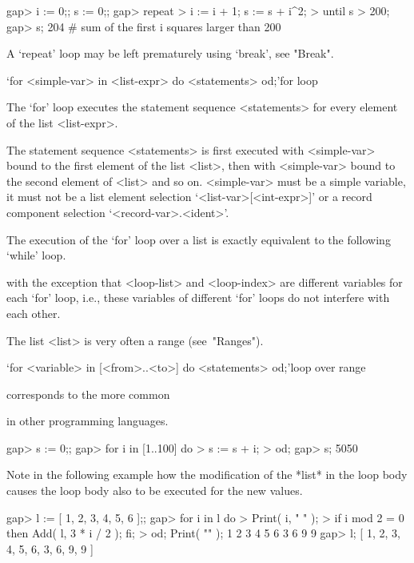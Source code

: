 {\beginexample
gap> i := 0;; s := 0;;
gap> repeat
>    i := i + 1; s := s + i^2;
>  until s > 200;
gap> s;
204    # sum of the first i squares larger than 200
\endexample

A `repeat' loop may be left prematurely using `break', see "Break".




\>`for <simple-var> in <list-expr> do <statements> od;'{for loop}

The `for' loop executes  the statement sequence <statements> for every
element of the list <list-expr>.

The statement sequence <statements> is first executed with <simple-var>
bound to the first element of the list <list>, then with <simple-var>
bound to the second element of <list> and so on. <simple-var> must be a
simple variable,  it  must not   be  a list   element  selection
`<list-var>[<int-expr>]'   or    a  record  component selection
`<record-var>.<ident>'.

The execution of the `for' loop over a list is exactly equivalent to
the following `while' loop.


with the  exception  that <loop-list> and <loop-index> are different
variables for each `for' loop,
i.e., these variables of different `for' loops do not interfere with
each other.

The list <list> is very often a range (see~"Ranges").

\>`for <variable> in [<from>..<to>] do <statements> od;'{loop over range}

corresponds to the more common


in other programming languages.

\beginexample
gap> s := 0;;
gap> for i in [1..100] do
>    s := s + i;
> od;
gap> s;
5050
\endexample

Note in the following example how the modification of the *list* in the
loop body causes the loop body also to be executed for the new values.

\beginexample
gap> l := [ 1, 2, 3, 4, 5, 6 ];;
gap> for i in l do
>    Print( i, " " );
>    if i mod 2 = 0 then Add( l, 3 * i / 2 ); fi;
> od; Print( "\n" );
1 2 3 4 5 6 3 6 9 9
gap> l;
[ 1, 2, 3, 4, 5, 6, 3, 6, 9, 9 ]
\endexample

}
